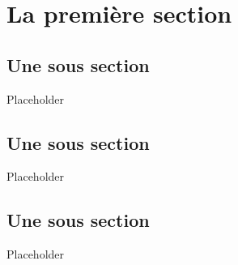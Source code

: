 \section{La première section}


\subsection{Une sous section}

Placeholder

\subsection{Une sous section}

Placeholder

\subsection{Une sous section}

Placeholder